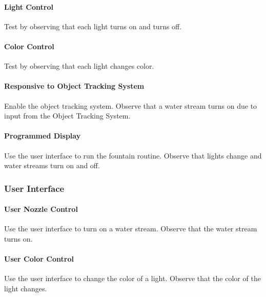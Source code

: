 \paragraph{Light Control}
Test by observing that each light turns on and turns off.

\paragraph{Color Control}
Test by observing that each light changes color.

\paragraph{Responsive to Object Tracking System} 
Enable the object tracking system. Observe that a water stream turns on due to input from the Object Tracking System.

\paragraph{Programmed Display}
Use the user interface to run the fountain routine. Observe that lights change and water streams turn on and off.

\subsubsection{User Interface}


\paragraph{User Nozzle Control}
Use the user interface to turn on a water stream. Observe that the water stream turns on.

\paragraph{User Color Control}
Use the user interface to change the color of a light. Observe that the color of the light changes. 

